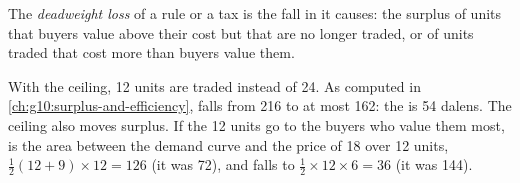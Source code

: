 \begin{definition}\label{def:g10:what-prices-do:dwl}
The \emph{deadweight loss} of a rule or a tax is the fall in  it causes: the surplus of units that buyers value above their cost
but that are no longer traded, or of units traded that cost more than buyers value them.
\end{definition}

With the ceiling, 12 units are traded instead of 24. As computed in \cref{ch:g10:surplus-and-efficiency},  falls from 216 to at most 162: the  is 54 dalens. The ceiling also moves surplus. If the 12 units go to the buyers who value them most,  is the area between the demand curve and the
price of 18 over 12 units, $\tfrac12 (12 + 9) \times 12 = 126$ (it was 72), and  falls to $\tfrac12 \times 12 \times 6 = 36$ (it was 144).

